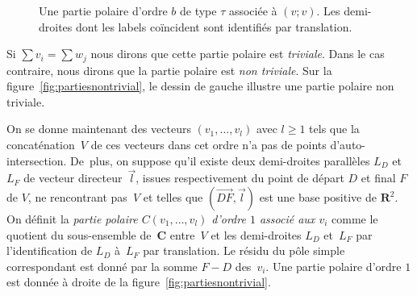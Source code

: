 \documentclass[JEP,XML,SOM,Unicode,francais,NoFloatCountersInSection,published]{cedram}
\newcommand{\RR}{\mathbf{R}}
\newcommand{\CC}{\mathbf{C}}
\theoremstyle{definition}
\begin{document}
\begin{figure}[htb]
\caption{Une partie polaire d'ordre $b$ de type $\tau$ associée à $(v;v)$. Les demi-droites dont les labels coïncident sont identifiés par translation.} \label{fig:ordreplusmoins}
\end{figure}

Si $\sum v_{i} =\sum w_{j}$ nous dirons que cette partie polaire est \emph{triviale}. Dans le cas contraire, nous dirons que la partie polaire est \emph{non triviale}. Sur la figure~\ref{fig:partiesnontrivial}, le dessin de gauche illustre une partie polaire non triviale.

On se donne maintenant des vecteurs $(v_{1},\dots,v_{l})$ avec $l\geq1$ tels que la concaténation~$V$ de ces vecteurs dans cet ordre n'a pas de points d'auto-intersection. De~plus, on suppose qu'il existe deux demi-droites parallèles $L_{D}$ et $L_{F}$ de vecteur directeur~$\overrightarrow{l}$, issues respectivement du point de départ $D$ et final $F$ de $V$, ne rencontrant pas~$V$ et telles que $(\overrightarrow{DF},\overrightarrow{l})$ est une base positive de $\RR^{2}$. On définit la \emph{partie polaire $C(v_{1},\dots,v_{l})$ d'ordre $1$ associé aux $v_{i}$} comme le quotient du sous-ensemble de~$\CC$ entre~$V$ et les demi-droites $L_{D}$ et~$L_{F}$ par l'identification de $L_{D}$ à~$L_{F}$ par translation. Le résidu du pôle simple correspondant est donné par la somme $F-D$ des~$v_{i}$. Une partie polaire d'ordre $1$ est donnée à droite de la figure~\ref{fig:partiesnontrivial}.
\end{document}
